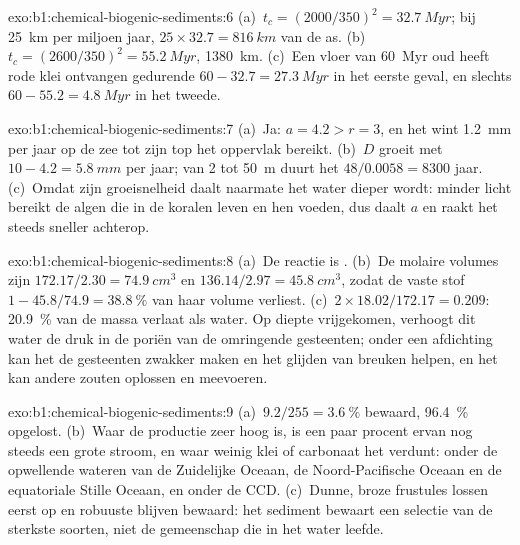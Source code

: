 \begin{solution}{exo:b1:chemical-biogenic-sediments:6}
(a)~$t_c = (2000/350)^2 = \qty{32.7}{Myr}$; bij \qty{25}{km} per miljoen jaar,
$25\times32.7 = \qty{816}{km}$ van de as. (b)~$t_c = (2600/350)^2 =
\qty{55.2}{Myr}$, \qty{1380}{km}. (c)~Een vloer van \qty{60}{Myr} oud heeft rode
klei ontvangen gedurende $60 - 32.7 = \qty{27.3}{Myr}$ in het eerste geval, en slechts
$60 - 55.2 = \qty{4.8}{Myr}$ in het tweede.
\end{solution}

\begin{solution}{exo:b1:chemical-biogenic-sediments:7}
(a)~Ja: $a = 4.2 > r = 3$, en het  wint \qty{1.2}{mm} per jaar op de zee
tot zijn top het oppervlak bereikt. (b)~$D$ groeit met $10 - 4.2 = \qty{5.8}{mm}$ per
jaar; van 2 tot \qty{50}{m} duurt het $48/0.0058 = \num{8300}$ jaar. (c)~Omdat
zijn groeisnelheid daalt naarmate het water dieper wordt: minder licht bereikt de algen die
in de koralen leven en hen voeden, dus daalt $a$ en raakt het  steeds sneller achterop.
\end{solution}

\begin{solution}{exo:b1:chemical-biogenic-sediments:8}
(a)~De reactie is . (b)~De molaire volumes zijn $172.17/2.30 =
\qty{74.9}{cm^3}$ en $136.14/2.97 = \qty{45.8}{cm^3}$, zodat de vaste stof
$1 - 45.8/74.9 = \qty{38.8}{\%}$ van haar volume verliest. (c)~$2\times18.02/172.17 = 0.209$:
\qty{20.9}{\%} van de massa verlaat als water. Op diepte vrijgekomen, verhoogt dit water
de druk in de poriën van de omringende gesteenten; onder een afdichting kan het de gesteenten
zwakker maken en het glijden van breuken helpen, en het kan andere zouten oplossen en meevoeren.
\end{solution}

\begin{solution}{exo:b1:chemical-biogenic-sediments:9}
(a)~$9.2/255 = \qty{3.6}{\%}$ bewaard, \qty{96.4}{\%} opgelost. (b)~Waar de
productie zeer hoog is, is een paar procent ervan nog steeds een grote stroom, en waar
weinig klei of carbonaat het verdunt: onder de opwellende wateren van de Zuidelijke
Oceaan, de Noord-Pacifische Oceaan en de equatoriale Stille Oceaan, en onder de CCD.
(c)~Dunne, broze frustules lossen eerst op en robuuste blijven bewaard: het sediment
bewaart een selectie van de sterkste soorten, niet de gemeenschap die in het water leefde.
\end{solution}

